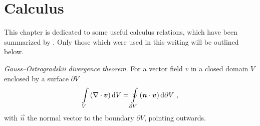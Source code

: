 \chapter{Calculus}
\label{app:calculus}
This chapter is dedicated to some useful calculus relations, which have been summarized by \textcite{bird1987}. Only those which were used in this writing will be outlined below.


\textit{Gauss--Ostrogradskii divergence theorem}. For a vector field \(v\) in a closed domain \(V\) enclosed by a surface \(\partial V\)
\begin{align}
  \label{ca:gauss}
  \int\limits_V \left(\nabla \cdot \vec{v}\right) \differential{V}
  = \oint\limits_{\partial V} \left(\vec{n} \cdot \vec{v}\right) \differential{\partial V} ~,
\end{align}
with \(\vec{n}\) the normal vector to the boundary \(\partial V\), pointing outwards.